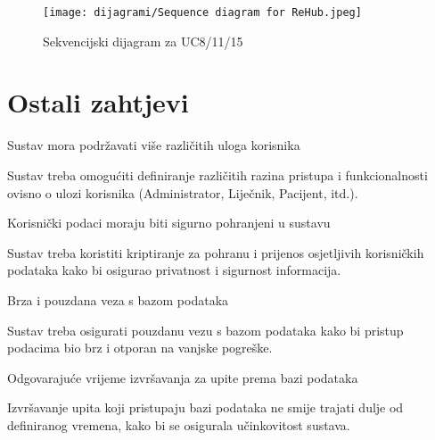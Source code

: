                     \begin{figure}[H]
			         \texttt{[image: dijagrami/Sequence diagram for ReHub.jpeg]}
			         \centering
			         \caption{Sekvencijski dijagram za UC8/11/15}
			         \label{fig:SequenceDiagram2}
		          \end{figure}
                
				\eject
	
		\section{Ostali zahtjevi}
		 
			 \begin{packed_enum}
				
				\large \item Sustav mora podržavati više različitih uloga korisnika \normalsize
                    \begin{packed_item}
                        \item Sustav treba omogućiti definiranje različitih razina pristupa i funkcionalnosti ovisno o ulozi korisnika (Administrator, Liječnik, Pacijent, itd.).
                    \end{packed_item}
				 \large \item Korisnički podaci moraju biti sigurno pohranjeni u sustavu	\normalsize
                    \begin{packed_item}
                        \item Sustav treba koristiti kriptiranje za pohranu i prijenos osjetljivih korisničkih podataka kako bi osigurao privatnost i sigurnost informacija.
                    \end{packed_item}
				 \large \item Brza i pouzdana veza s bazom podataka \normalsize
                    \begin{packed_item}
                        \item Sustav treba osigurati pouzdanu vezu s bazom podataka kako bi pristup podacima bio brz i otporan na vanjske pogreške.
                    \end{packed_item}
                 \large \item Odgovarajuće vrijeme izvršavanja za upite prema bazi podataka \normalsize
                    \begin{packed_item}
                        \item Izvršavanje upita koji pristupaju bazi podataka ne smije trajati dulje od definiranog vremena, kako bi se osigurala učinkovitost sustava.

\end{packed_item}
\end{packed_enum}

